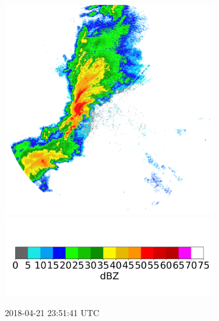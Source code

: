 \begin{figure}[h]
\begin{subfigure}[b]{0.3\textwidth}
		\includegraphics[width=\textwidth]{./thesis_code/plots/midlothian.tx-20180421-235141-ref.png}
		\includegraphics[width=\textwidth]{./thesis_code/plots/dfw_colormap.png}
		\caption{2018-04-21 23:51:41 UTC}
		\label{fig:bestmodel_translation2}
	\end{subfigure}
	\begin{subfigure}[b]{0.3\textwidth}

\end{subfigure}
\end{figure}
